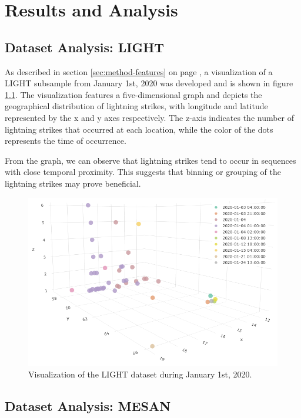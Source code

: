 \chapter{Results and Analysis}
\label{sec:results}

\section{Dataset Analysis: LIGHT}
\label{sec:analysis-light}

As described in section \ref{sec:method-features} on page \pageref{sec:method-features}, a visualization of a LIGHT subsample from January 1st, 2020 was developed and is shown in figure \ref{fig:overview-light}. The visualization features a five-dimensional graph and depicts the geographical distribution of lightning strikes, with longitude and latitude represented by the x and y axes respectively. The z-axis indicates the number of lightning strikes that occurred at each location, while the color of the dots represents the time of occurrence.

From the graph, we can observe that lightning strikes tend to occur in sequences with close temporal proximity. This suggests that binning or grouping of the lightning strikes may prove beneficial.

\begin{figure}[H]
	\centering
	\includegraphics[width=\linewidth, keepaspectratio]{figures/light-graph}
	\caption{Visualization of the LIGHT dataset during January 1st, 2020.}
	\label{fig:overview-light}
\end{figure}

\section{Dataset Analysis: MESAN}

